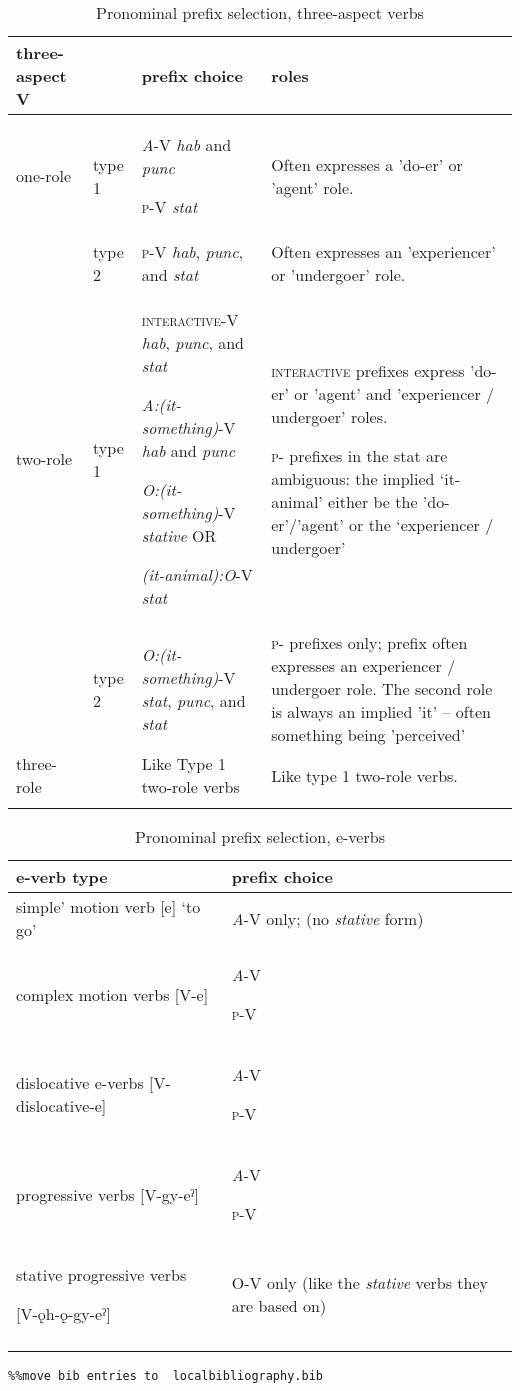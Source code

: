 \begin{table}
\caption{Pronominal prefix selection, three-aspect verbs}
\label{tab:1:ppthreeaspv}
\scriptsize{
\begin{tabularx}{\textwidth}{XXXX}
\lsptoprule
three-aspect V &  & prefix choice & roles\\
\midrule
one-role & type 1 & \textit{A}{}-V \textit{hab} and \textit{punc}

\textsc{p}-V \textit{stat} & Often expresses a 'do-er' or 'agent' role.\\
& type 2 & \textsc{p}-V \textit{hab}, \textit{punc}, and \textit{stat} & Often expresses an 'experiencer' or 'undergoer' role.\\
\midrule
two-role & type 1 & \textsc{interactive}-V \textit{hab}, \textit{punc}, and \textit{stat}

\textit{A:(it-something)}{}-V \textit{hab} and \textit{punc}

\textit{O:(it-something)}{}-V \textit{stative} OR

\textit{(it-animal):O}{}-V \textit{stat} & \textsc{interactive} prefixes express 'do-er' or 'agent' and 'experiencer / undergoer' roles.

\textsc{p}- prefixes in the stat are ambiguous: the implied ‘it-animal’ either be the 'do-er'/'agent' or the ‘experiencer / undergoer’ \\
\midrule
& type 2 & \textit{O:(it-something)}{}-V \textit{stat}, \textit{punc}, and \textit{stat} & \textsc{p}- prefixes only; prefix often expresses an experiencer / undergoer role. The second role is always an implied 'it' – often something being 'perceived'\\
\midrule
three-role &  & Like Type 1 two-role verbs & Like type 1 two-role verbs.\\
\lspbottomrule
\end{tabularx}}
\end{table}


\begin{table}
\caption{Pronominal prefix selection, e-verbs}
\label{tab:1:ppseleverb}
\scriptsize{
\begin{tabularx}{\textwidth}{XX}
\lsptoprule
e-verb type & prefix choice\\
\midrule
simple’ motion verb [e] ‘to go’

& \textit{A}{}-V only; (no \textit{stative} form)\\
complex motion verbs [V-e] & \textit{A}{}-V

\textsc{p}-V

\\
dislocative e-verbs [V-dislocative-e] & \textit{A}{}-V

\textsc{p}-V

\\
progressive verbs [V-gy-eˀ] & \textit{A}{}-V

\textsc{p}-V

\\
stative progressive verbs 

{} [V-ǫh-ǫ{}-gy-eˀ] & O-V only (like the \textit{stative} verbs they are based on)\\
\lspbottomrule
\end{tabularx}}
\end{table}

\begin{verbatim}%%move bib entries to  localbibliography.bib
\end{verbatim} 
